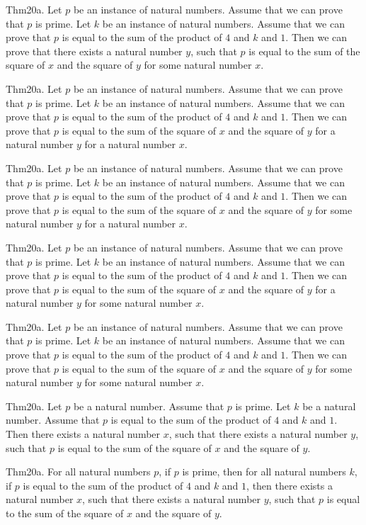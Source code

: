 \documentclass{article}
\begin{document}
Thm20a. Let $p$ be an instance of natural numbers. Assume that we can prove that $p$ is prime. Let $k$ be an instance of natural numbers. Assume that we can prove that $p$ is equal to the sum of the product of $4$ and $k$ and $1$. Then we can prove that there exists a natural number $y$, such that $p$ is equal to the sum of the square of $x$ and the square of $y$ for some natural number $x$.

Thm20a. Let $p$ be an instance of natural numbers. Assume that we can prove that $p$ is prime. Let $k$ be an instance of natural numbers. Assume that we can prove that $p$ is equal to the sum of the product of $4$ and $k$ and $1$. Then we can prove that $p$ is equal to the sum of the square of $x$ and the square of $y$ for a natural number $y$ for a natural number $x$.

Thm20a. Let $p$ be an instance of natural numbers. Assume that we can prove that $p$ is prime. Let $k$ be an instance of natural numbers. Assume that we can prove that $p$ is equal to the sum of the product of $4$ and $k$ and $1$. Then we can prove that $p$ is equal to the sum of the square of $x$ and the square of $y$ for some natural number $y$ for a natural number $x$.

Thm20a. Let $p$ be an instance of natural numbers. Assume that we can prove that $p$ is prime. Let $k$ be an instance of natural numbers. Assume that we can prove that $p$ is equal to the sum of the product of $4$ and $k$ and $1$. Then we can prove that $p$ is equal to the sum of the square of $x$ and the square of $y$ for a natural number $y$ for some natural number $x$.

Thm20a. Let $p$ be an instance of natural numbers. Assume that we can prove that $p$ is prime. Let $k$ be an instance of natural numbers. Assume that we can prove that $p$ is equal to the sum of the product of $4$ and $k$ and $1$. Then we can prove that $p$ is equal to the sum of the square of $x$ and the square of $y$ for some natural number $y$ for some natural number $x$.

Thm20a. Let $p$ be a natural number. Assume that $p$ is prime. Let $k$ be a natural number. Assume that $p$ is equal to the sum of the product of $4$ and $k$ and $1$. Then there exists a natural number $x$, such that there exists a natural number $y$, such that $p$ is equal to the sum of the square of $x$ and the square of $y$.

Thm20a. For all natural numbers $p$, if $p$ is prime, then for all natural numbers $k$, if $p$ is equal to the sum of the product of $4$ and $k$ and $1$, then there exists a natural number $x$, such that there exists a natural number $y$, such that $p$ is equal to the sum of the square of $x$ and the square of $y$.
\end{document}
